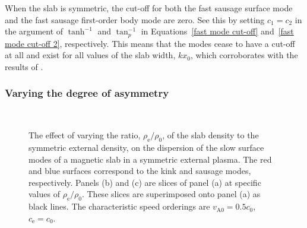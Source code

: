 When the slab is symmetric, the cut-off for both the fast sausage surface mode and the fast sausage first-order body mode are zero. See this by setting $c_1 = c_2$ in the argument of $\tanh^{-1}$ and $\tan_p^{-1}$ in Equations~\eqref{fast mode cut-off} and~\eqref{fast mode cut-off 2}, respectively. This means that the modes cease to have a cut-off at all and exist for all values of the slab width, $kx_0$, which corroborates with the results of \cite{rob81b}.


\subsubsection{Varying the degree of asymmetry}

\begin{figure}
	\centering
	 \\
	\caption{The effect of varying the ratio, $\rho_\textrm{e}/\rho_0$, of the slab density to the symmetric external density, on the dispersion of the slow surface modes of a magnetic slab in a symmetric external plasma. The red and blue surfaces correspond to the kink and sausage modes, respectively. Panels (b) and (c) are slices of panel (a) at specific values of $\rho_\textrm{e}/\rho_0$. These slices are superimposed onto panel (a) as black lines. The characteristic speed orderings are $v_\textrm{A0} = 0.5c_0$, $c_\textrm{e} = c_0$.}
\end{figure}


